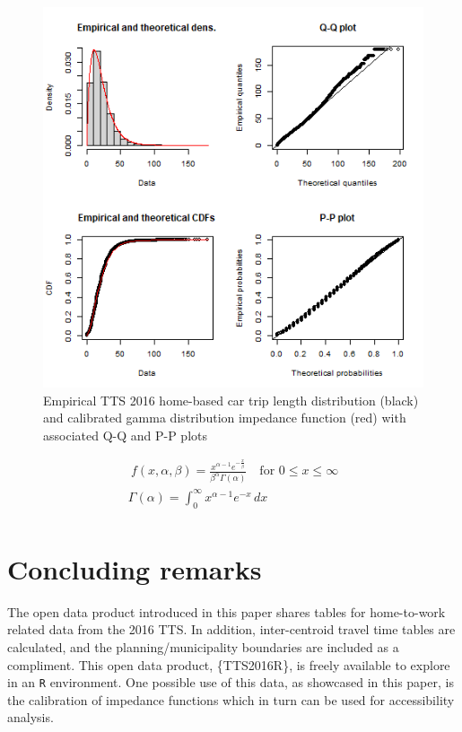 \documentclass[Royal,times,sageh]{sagej}
\begin{document}
\begin{figure}

{\centering \includegraphics[width=0.75\linewidth]{images/impedance_function} 

}

\caption{\label{fig:TLD-Gamma-plot}Empirical TTS 2016 home-based car trip length distribution (black) and calibrated gamma distribution impedance function (red) with associated Q-Q and P-P plots}\label{fig:TLD-Gamma-plot}
\end{figure}

\begin{equation}
\label{gamma-dist}
\begin{array}{l}\ 
f(x, \alpha, \beta) = \frac {x^{\alpha-1}e^{-\frac{x}{\beta}}}{ \beta^{\alpha}\Gamma(\alpha)} \quad \text{for } 0 \leq x \leq \infty\\
\Gamma(\alpha) =  \int_{0}^{\infty} x^{\alpha-1}e^{-x} \,dx\\
\end{array}
\end{equation}

\newpage

\hypertarget{concluding-remarks}{%
\section{Concluding remarks}\label{concluding-remarks}}

The open data product introduced in this paper shares tables for
home-to-work related data from the 2016 TTS. In addition, inter-centroid
travel time tables are calculated, and the planning/municipality
boundaries are included as a compliment. This open data product,
\{TTS2016R\}, is freely available to explore in an \texttt{R}
environment. One possible use of this data, as showcased in this paper,
is the calibration of impedance functions which in turn can be used for
accessibility analysis.
\end{document}
